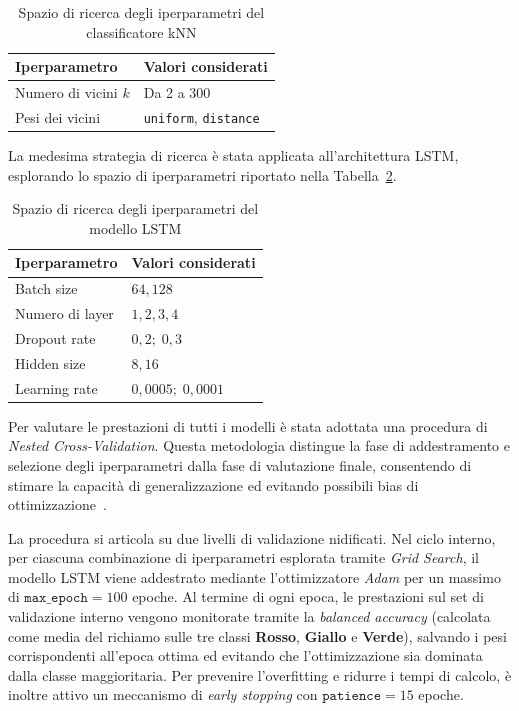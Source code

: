 \documentclass[a4paper,12pt]{report}
\begin{document}
\begin{table}[H]
\centering
\caption{Spazio di ricerca degli iperparametri del classificatore kNN}
\label{tab:knn_grid}
\begin{tabular}{ll}
\toprule
\textbf{Iperparametro} & \textbf{Valori considerati} \\
\midrule
Numero di vicini \(k\) & Da 2 a 300 \\
Pesi dei vicini & \texttt{uniform}, \texttt{distance} \\
\bottomrule
\end{tabular}
\end{table}

La medesima strategia di ricerca è stata applicata all'architettura LSTM, esplorando lo spazio di iperparametri riportato nella Tabella~\ref{tab:lstm_grid}.

\begin{table}[htbp]
\centering
\caption{Spazio di ricerca degli iperparametri del modello LSTM}
\label{tab:lstm_grid}
\begin{tabular}{ll}
\toprule
\textbf{Iperparametro} & \textbf{Valori considerati} \\
\midrule
Batch size & $64, 128$ \\
Numero di layer & $1, 2, 3, 4$ \\
Dropout rate & $0,2;\; 0,3$ \\
Hidden size & $8, 16$ \\
Learning rate & $0,0005;\; 0,0001$ \\
\bottomrule
\end{tabular}
\end{table}

Per valutare le prestazioni di tutti i modelli è stata adottata una procedura di \textit{Nested Cross-Validation}. Questa metodologia distingue la fase di addestramento e selezione degli iperparametri dalla fase di valutazione finale, consentendo di stimare la capacità di generalizzazione ed evitando possibili bias di ottimizzazione~\cite{NESTEDCV2006}.

La procedura si articola su due livelli di validazione nidificati. Nel ciclo interno, per ciascuna combinazione di iperparametri esplorata tramite \textit{Grid Search}, il modello LSTM viene addestrato mediante l'ottimizzatore \textit{Adam} per un massimo di \(\texttt{max\_epoch} = 100\) epoche. Al termine di ogni epoca, le prestazioni sul set di validazione interno vengono monitorate tramite la \textit{balanced accuracy} (calcolata come media del richiamo sulle tre classi \textbf{Rosso}, \textbf{Giallo} e \textbf{Verde}), salvando i pesi corrispondenti all'epoca ottima ed evitando che l'ottimizzazione sia dominata dalla classe maggioritaria. Per prevenire l'overfitting e ridurre i tempi di calcolo, è inoltre attivo un meccanismo di \textit{early stopping} con \(\texttt{patience} = 15\) epoche.
\end{document}
